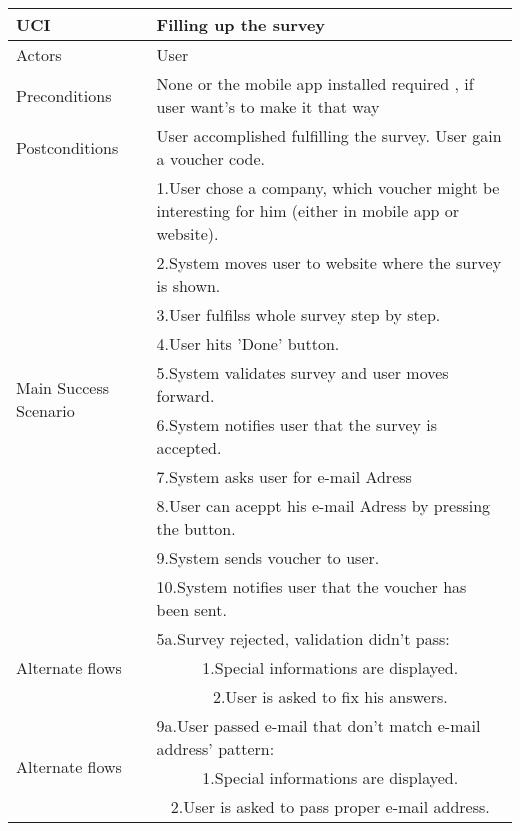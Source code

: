 	\begin{table}[H]
	\centering
	\sffamily\captionsetup{justification=raggedright,singlelinecheck=false,position = below, font = sf}
	\begin{tabular}{|m{3.5cm}|m{11cm}|}
	\hline 
	UCI & Filling up the survey \\
	\hline
	Actors & User \\ 
	\hline
	Preconditions & None or the mobile app installed required , if user want's to make it that way \\
	\hline
	Postconditions & User accomplished fulfilling the survey. User gain a voucher code. \\
	\multirow{10}{*}{Main Success Scenario} & 1.User chose a company, which voucher might be interesting for him (either in mobile app or website). \\
	\cline{2-2}
	& 2.System moves user to website where the survey is shown. \\
	\cline{2-2}
	& 3.User fulfilss whole survey step by step. \\
	\cline{2-2}
	& 4.User hits 'Done' button. \\
	\cline{2-2}
	& 5.System validates survey and user moves forward. \\
	\cline{2-2}
	& 6.System notifies user that the survey is accepted. \\
	\cline{2-2}
	& 7.System asks user for e-mail Adress	 \\
	\cline{2-2}
	& 8.User can aceppt his e-mail Adress by pressing the button.  \\
	\cline{2-2}
	& 9.System sends voucher to user. \\
	\cline{2-2}
	& 10.System notifies user that the voucher has been sent. \\
	\hline
	\multirow{3}{*}{Alternate flows} & 5a.Survey rejected, validation didn't pass: \\
	\cline{2-2}
	& \multicolumn{1}{c|}{1.Special informations are displayed.} \\
	\cline{2-2}
	& \multicolumn{1}{c|}{2.User is asked to fix his answers.} \\
	\cline{2-2}
	\multirow{3}{*}{Alternate flows} & 9a.User passed e-mail that don't match e-mail address' pattern: \\
	\cline{2-2}
	& \multicolumn{1}{c|}{1.Special informations are displayed.} \\
	\cline{2-2}
	& \multicolumn{1}{c|}{2.User is asked to pass proper e-mail address.} \\
	\hline	
	\end{tabular}
	\end{table}	
	

